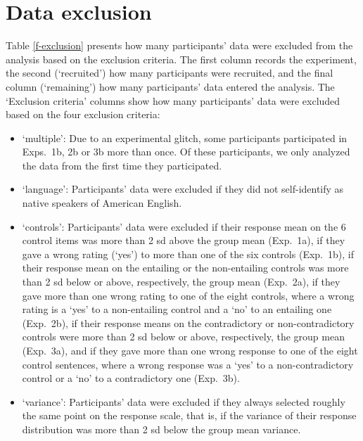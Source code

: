 \documentclass[11pt,fleqn]{article}
\newcommand{\6}{\mbox{$[\hspace*{-.6mm}[$}}
\newcommand{\9}{\mbox{$]\hspace*{-.6mm}]$}}
\begin{document}
\section{Data exclusion}\label{a-excl}

Table \ref{f-exclusion} presents how many participants' data were excluded from the analysis based on the exclusion criteria. The first column records the experiment, the second (`recruited') how many participants were recruited, and the final column (`remaining') how many participants' data entered the analysis. The `Exclusion criteria' columns show how many participants' data were excluded based on the four exclusion criteria: 

\begin{itemize}[topsep = -1ex,itemsep=-2pt]

\item `multiple': Due to an experimental glitch, some participants participated in Exps.~1b, 2b or 3b more than once. Of these participants, we only analyzed the data from the first time they participated.

\item `language': Participants' data were excluded if they did not self-identify as native speakers of American English.

\item `controls': Participants' data were excluded if their response mean on the 6 control items was more than 2 sd above the group mean (Exp.~1a), if they gave a wrong rating (`yes') to more than one of the six controls (Exp.~1b), if their response mean on the entailing or the non-entailing controls was more than 2 sd below or above, respectively, the group mean (Exp.~2a), if they gave more than one wrong rating to one of the eight controls, where a wrong rating is a `yes' to a non-entailing control and a `no' to an entailing one (Exp.~2b), if their response means on the contradictory or non-contradictory controls were more than 2 sd below or above, respectively, the group mean (Exp.~3a), and if they gave more than one wrong response to one of the eight control sentences, where a wrong response was a `yes' to a non-contradictory control or a `no' to a contradictory one (Exp.~3b).

\item `variance': Participants' data were excluded if they always selected roughly the same point on the response scale, that is, if the variance of their response distribution was more than 2 sd below the group mean variance.

\end{itemize}
\end{document}
